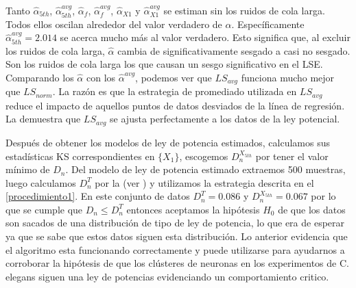 	Tanto $\hat{\alpha}_{5th}$,  $\hat{\alpha}_{5th}^{avg}$, $\hat{\alpha}_{f}$, $\hat{\alpha}_{f}^{avg}$, $\hat{\alpha}_{X1}$ y   $\hat{\alpha}_{X1}^{avg}$ se estiman sin  los ruidos de cola larga. Todos ellos oscilan alrededor del valor verdadero de $\alpha$.  Específicamente $\hat{\alpha}_{5th}^{avg}=2.014$ se acerca mucho más al valor verdadero.  Esto significa que, al excluir los ruidos de cola larga, $\hat{\alpha}$ cambia de significativamente sesgado a casi no sesgado. Son los ruidos de cola larga los que causan un sesgo significativo en el LSE.  Comparando los $\hat{\alpha}$ con los $\hat{\alpha}^{avg}$, podemos ver que $LS_{avg}$ funciona mucho mejor que  $LS_{norm}$.  La razón es que la estrategia de promediado utilizada en $LS_{avg}$ reduce el impacto de aquellos puntos de datos desviados de la línea de regresión. La    demuestra que $LS_{avg}$ se ajusta perfectamente a los datos de la ley potencial.
	
	
	
Después de obtener los modelos de ley de potencia estimados, calculamos sus estadísticas KS correspondientes en $\{ X_1 \}$, escogemos $D_n^{X_{5th}}$ por tener el valor  mínimo de $D_n$.  Del modelo de ley de potencia estimado extraemos 500 muestras, luego calculamos $D_n^T$ por la   (ver )  y utilizamos la estrategia descrita en el \cref{procedimiento1}. En este conjunto de datos $D_n^T=0.086$ y $D_n^{X_{5th}}=0.067$ por lo que se cumple que $D_n\leq D_n^T$ entonces aceptamos la hipótesis $H_0$ de que los datos son sacados de una distribución de tipo de ley de potencia, lo que era de esperar ya que se sabe que estos datos siguen esta distribución. Lo anterior evidencia que el algoritmo esta funcionando correctamente y puede  utilizarse para ayudarnos a corroborar la hipótesis de  que los clústeres de neuronas  en los experimentos de C. elegans  siguen una ley de potencias evidenciando  un comportamiento critico. 


